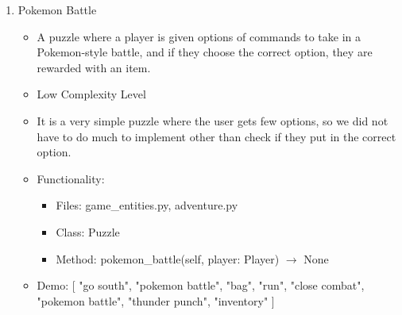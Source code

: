 \documentclass[11pt]{article}
\begin{document}
\begin{enumerate}
    \item Pokemon Battle
    \begin{itemize}
       \item A puzzle where a player is given options of commands to take in a Pokemon-style battle, and if they choose the correct option, they are rewarded with an item.
       \item Low Complexity Level
       \item   It is a very simple puzzle where the user gets few options, so we did not have to do much to implement other than check if they put in the correct option.
       \item Functionality:
        \begin{itemize}
            \item Files: game\_entities.py, adventure.py
            \item Class: Puzzle
            \item Method: pokemon\_battle(self, player: Player) $\rightarrow$ None
        \end{itemize}
       \item Demo: [
        "go south", "pokemon battle", "bag", "run", "close combat", "pokemon battle", "thunder punch",
        "inventory"
    ]
    \end{itemize}
    

\end{enumerate}
\end{document}
